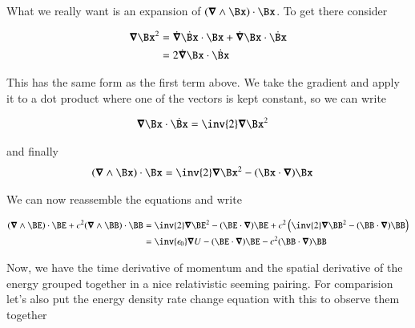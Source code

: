 \documentclass{article}
\begin{document}
%

What we really want is an expansion of $(\spacegrad \wedge \Bx) \cdot \Bx$.  To get there consider

\begin{align*}
\spacegrad \Bx^2
&= \dot{\spacegrad} \dot{\Bx} \cdot \Bx + \dot{\spacegrad} {\Bx} \cdot \dot{\Bx} \\
&= 2 \dot{\spacegrad} {\Bx} \cdot \dot{\Bx} \\
\end{align*}

This has the same form as the first term above.  We take the gradient and apply it to a dot product where one of the vectors is kept constant, so we can write

\begin{align*}
{\spacegrad} {\Bx} \cdot \dot{\Bx} &= \inv{2} \spacegrad \Bx^2
\end{align*}

and finally
\begin{align}\label{eqn:wedgedot}
(\spacegrad \wedge \Bx) \cdot \Bx
&= \inv{2} \spacegrad \Bx^2 - (\Bx \cdot \spacegrad) \Bx
\end{align}

We can now reassemble the equations and write

\begin{align*}
(\spacegrad \wedge \BE) \cdot \BE + c^2 (\spacegrad \wedge \BB) \cdot \BB
&=
\inv{2} \spacegrad \BE^2 - (\BE \cdot \spacegrad) \BE
+ c^2 \left(\inv{2} \spacegrad \BB^2 - (\BB \cdot \spacegrad) \BB \right) \\
&= \inv{\epsilon_0} \spacegrad U - (\BE \cdot \spacegrad) \BE - c^2 (\BB \cdot \spacegrad) \BB \\
\end{align*}

Now, we have the time derivative of momentum and the spatial derivative of the energy grouped together in a nice
relativistic seeming pairing.  For comparision let's also put the energy density rate change equation with this
to observe them together
\end{document}
